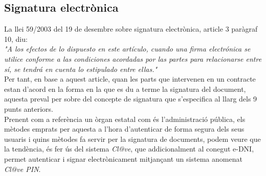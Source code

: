 \subsection{Signatura electrònica}
\label{estatArt:signature}

\cite{boe} La llei 59/2003 del 19 de desembre sobre signatura electrònica, article 3 paràgraf 10, diu:\\
\newline \textit{"A los efectos de lo dispuesto en este artículo, cuando una firma electrónica se utilice conforme a las condiciones acordadas por las partes para relacionarse entre sí, se tendrá en cuenta lo estipulado entre ellas."}\\
\newline Per tant, en base a aquest article, quan les parts que intervenen en un contracte estan d'acord en la forma en la que es du a terme la signatura del document, aquesta preval per sobre del concepte de signatura que s'especifica al llarg dels 9 punts anteriors.\\
\newline Prenent com a referència un òrgan estatal com és l'administració pública, els mètodes emprats per aquesta a l'hora d'autenticar de forma segura dels seus usuaris i quins mètodes fa servir per la signatura de documents, podem veure que la tendència, és fer ús del sistema \textit{Cl@ve}, que addicionalment al conegut e-DNI, permet autenticar i signar electrònicament mitjançant un sistema anomenat \textit{Cl@ve PIN}.\\
